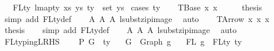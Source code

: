 \begin{isabellebody}
\ \ \ {\isachardoublequoteopen}FLty\ {\isacharparenleft}{\kern0pt}lmap{\isacharunderscore}{\kern0pt}ty\ xs\ ys\ ty{\isacharparenright}{\kern0pt}\ {\isacharequal}{\kern0pt}\ set\ ys{\isachardoublequoteclose}\isanewline
%
\isadelimproof
%
\endisadelimproof
%
\isatagproof
{}\isamarkupfalse%
\ {\isacharparenleft}{\kern0pt}cases\ ty{\isacharparenright}{\kern0pt}\isanewline
\ \ \isamarkupfalse%
\ {\isacharparenleft}{\kern0pt}TBase\ x{}{}\ x{}{}{\isacharparenright}{\kern0pt}\isanewline
\ \ \isamarkupfalse%
\ \isamarkupfalse%
\ {\isacharquery}{\kern0pt}thesis\isanewline
\ \ \isamarkupfalse%
\ {\isacharparenleft}{\kern0pt}simp\ add{\isacharcolon}{\kern0pt}\ FLty{\isacharunderscore}{\kern0pt}def{\isacharparenright}{\kern0pt}\isanewline
\ \ \isamarkupfalse%
\ A{}\ A{}\ A{}\ lsubst{\isacharunderscore}{\kern0pt}zip{\isacharunderscore}{\kern0pt}image\ \isamarkupfalse%
\ auto\isanewline
{}\isamarkupfalse%
\isanewline
\ \ \isamarkupfalse%
\ {\isacharparenleft}{\kern0pt}TArrow\ x{}{}\ x{}{}\ x{}{}{\isacharparenright}{\kern0pt}\isanewline
\ \ \isamarkupfalse%
\ \isamarkupfalse%
\ {\isacharquery}{\kern0pt}thesis\isanewline
\ \ \isamarkupfalse%
\ {\isacharparenleft}{\kern0pt}simp\ add{\isacharcolon}{\kern0pt}\ FLty{\isacharunderscore}{\kern0pt}def{\isacharparenright}{\kern0pt}\isanewline
\ \ \isamarkupfalse%
\ A{}\ A{}\ A{}\ lsubst{\isacharunderscore}{\kern0pt}zip{\isacharunderscore}{\kern0pt}image\ \isamarkupfalse%
\ auto\isanewline
{}\isamarkupfalse%
%
\endisatagproof
{\isafoldproof}%
%
\isadelimproof
\isanewline
%
\endisadelimproof
\isanewline
\isanewline
{}\isamarkupfalse%
\ FL{\isacharunderscore}{\kern0pt}typing{\isacharunderscore}{\kern0pt}LRHS{\isacharcolon}{\kern0pt}\isanewline
\ \ \ {\isachardoublequoteopen}{\isasymGamma}\ {\isasymturnstile}{\isacharbraceleft}{\kern0pt}P{\isacharbraceright}{\kern0pt}\ G\ {\isacharcolon}{\kern0pt}\ ty{\isachardoublequoteclose}\isanewline
\ \ \ {\isachardoublequoteopen}G\ {\isacharequal}{\kern0pt}\ Graph\ g{\isachardoublequoteclose}\isanewline
\ \ \ {\isachardoublequoteopen}FL\ g\ {\isacharequal}{\kern0pt}\ FLty\ ty{\isachardoublequoteclose}\isanewline

\end{isabellebody}
